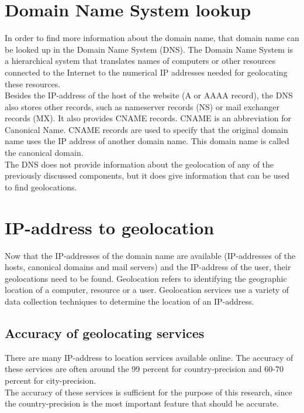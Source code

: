 \documentclass[twoside,openright,notitlepage]{uva-bachelor-thesis}
\begin{document}
\section{Domain Name System lookup}
In order to find more information about the domain name, that domain name can be looked up in the Domain Name System (DNS). The Domain Name System is a hierarchical system that translates names of computers or other resources connected to the Internet to the numerical IP addresses needed for geolocating these resources.\\

Besides the IP-address of the host of the website (A or AAAA record), the DNS also stores other records, such as nameserver records (NS) or mail exchanger records (MX). It also provides CNAME records. CNAME is an abbreviation for Canonical Name. CNAME records are used to specify that the original domain name uses the IP address of another domain name. This domain name is called the canonical domain.~\cite{mockapetris1987domain}\\

The DNS does not provide information about the geolocation
of any of the previously discussed components, but it does give information that can be used to find geolocations.

\section{IP-address to geolocation}
Now that the IP-addresses of the domain name are available (IP-addresses of the hosts, canonical domains and mail servers) and the IP-address of the user, their geolocations need to be found. Geolocation refers to identifying the geographic location of a computer, resource or a user. Geolocation services use a variety of data collection techniques to determine the location of an IP-address.

\subsection{Accuracy of geolocating services}
There are many IP-address to location services available online. The accuracy of these services are often around the 99 percent for country-precision and 60-70 percent for city-precision.~\cite{ipapi,hostapi,ipinfodb,geobytes,ip2loc,maxmind}\\
The accuracy of these services is sufficient for the purpose of this research, since the country-precision is the most important feature that should be accurate.\\
\end{document}
